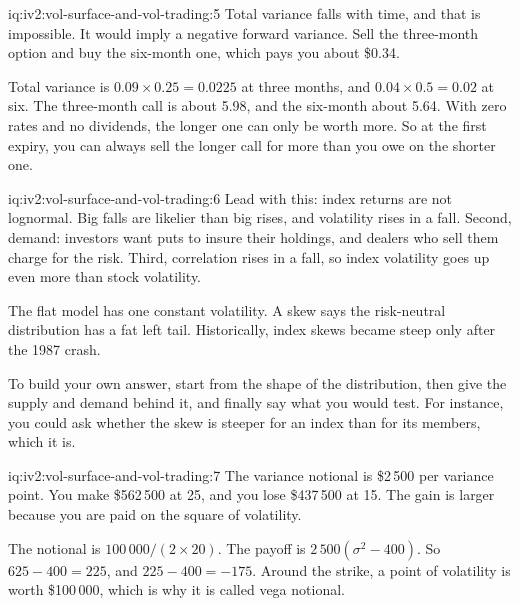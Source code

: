 \begin{solution}{iq:iv2:vol-surface-and-vol-trading:5}
Total variance falls with time, and that is impossible. It would imply a negative forward variance. Sell the three-month option and buy the six-month one, which pays you about \$0.34.

Total variance is $0.09 \times 0.25 = 0.0225$ at three months, and $0.04 \times 0.5 = 0.02$ at six. The three-month call is about 5.98, and the six-month about 5.64. With zero rates and no dividends, the longer one can only be worth more. So at the first expiry, you can always sell the longer call for more than you owe on the shorter one.

\end{solution}

\begin{solution}{iq:iv2:vol-surface-and-vol-trading:6}
Lead with this: index returns are not lognormal. Big falls are likelier than big rises, and volatility rises in a fall. Second, demand: investors want puts to insure their holdings, and dealers who sell them charge for the risk. Third, correlation rises in a fall, so index volatility goes up even more than stock volatility.

The flat model has one constant volatility. A skew says the risk-neutral distribution has a fat left tail. Historically, index skews became steep only after the 1987 crash.

To build your own answer, start from the shape of the distribution, then give the supply and demand behind it, and finally say what you would test. For instance, you could ask whether the skew is steeper for an index than for its members, which it is.

\end{solution}

\begin{solution}{iq:iv2:vol-surface-and-vol-trading:7}
The variance notional is \$2\,500 per variance point. You make \$562\,500 at 25, and you lose \$437\,500 at 15. The gain is larger because you are paid on the square of volatility.

The notional is $100\,000/(2 \times 20)$. The payoff is $2\,500(\sigma^2 - 400)$. So $625 - 400 = 225$, and $225 - 400 = -175$. Around the strike, a point of volatility is worth \$100\,000, which is why it is called vega notional.

\end{solution}

